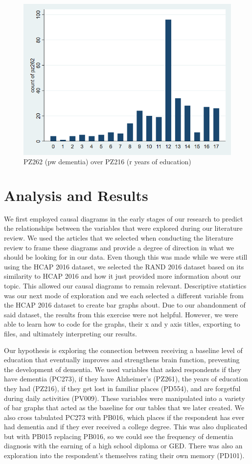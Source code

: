 \documentclass{article}
\begin{document}
\begin{figure}
    \centering
    \includegraphics[width=0.5\linewidth]{pz262_over_pz216.png}
    \caption{PZ262 (pw dementia) over PZ216 (r years of education)}
    \label{fig:enter-label}
\end{figure}

\section{Analysis and Results}
\label{sec:result}

\hspace*{1em} We first employed causal diagrams in the early stages of our research to predict the relationships between the variables that were explored during our literature review. We used the articles that we selected when conducting the literature review to frame these diagrams and provide a degree of direction in what we should be looking for in our data. Even though this was made while we were still using the HCAP 2016 dataset, we selected the RAND 2016 dataset based on its similarity to HCAP 2016 and how it just provided more information about our topic. This allowed our causal diagrams to remain relevant. Descriptive statistics was our next mode of exploration and we each selected a different variable from the HCAP 2016 dataset to create bar graphs about. Due to our abandonment of said dataset, the results from this exercise were not helpful. However, we were able to learn how to code for the graphs, their x and y axis titles, exporting to files, and ultimately interpreting our results.

\hspace*{1em} Our hypothesis is exploring the connection between receiving a baseline level of education that eventually improves and strengthens brain function, preventing the development of dementia. We used variables that asked respondents if they have dementia (PC273), if they have Alzheimer’s (PZ261), the years of education they had (PZ216), if they get lost in familiar places (PD554), and are forgetful during daily activities (PV009). These variables were manipulated into a variety of bar graphs that acted as the baseline for our tables that we later created. We also cross tabulated PC273 with PB016, which places if the respondent has ever had dementia and if they ever received a college degree. This was also duplicated but with PB015 replacing PB016, so we could see the frequency of dementia diagnosis with the earning of a high school diploma or GED. There was also an exploration into the respondent’s themselves rating their own memory (PD101).
\end{document}
